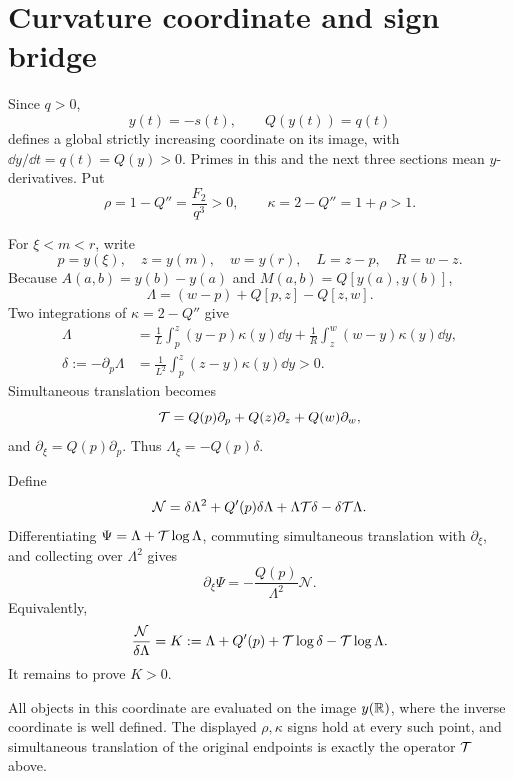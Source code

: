 \section{Curvature coordinate and sign bridge}\label{sec:coordinate}

Since \(q>0\),
\[
 y(t)=-s(t),\qquad Q(y(t))=q(t)
\]
defines a global strictly increasing coordinate on its image, with
\(\dd y/\dd t=q(t)=Q(y)>0\). Primes in this and the next three sections mean
\(y\)-derivatives. Put
\[
 \rho=1-Q''=\frac{F_2}{q^3}>0,
 \qquad \kappa=2-Q''=1+\rho>1.
\]

For \(\xi<m<r\), write
\[
 p=y(\xi),\quad z=y(m),\quad w=y(r),\quad L=z-p,\quad R=w-z.
\]
Because \(A(a,b)=y(b)-y(a)\) and
\(M(a,b)=Q[y(a),y(b)]\),
\begin{equation}\label{eq:Lambda-coordinate}
 \Lambda=(w-p)+Q[p,z]-Q[z,w].
\end{equation}
Two integrations of \(\kappa=2-Q''\) give
\begin{align}
 \Lambda&=\frac1L\int_p^z(y-p)\kappa(y)\dd y
 +\frac1R\int_z^w(w-y)\kappa(y)\dd y,\label{eq:Lambda-triangular}\\
 \delta:=-\partial_p\Lambda
 &=\frac1{L^2}\int_p^z(z-y)\kappa(y)\dd y>0.
 \label{eq:delta-triangular}
\end{align}
Simultaneous translation becomes
\[
 \mathcal{T}=Q(p)\partial_p+Q(z)\partial_z+Q(w)\partial_w,
\]
and \(\partial_\xi=Q(p)\partial_p\). Thus
\(\Lambda_\xi=-Q(p)\delta\).

Define
\begin{equation}\label{eq:N-def}
 \mathcal N=\delta\Lambda^2+Q'(p)\delta\Lambda+
 \Lambda\mathcal{T}\delta-\delta\mathcal{T}\Lambda.
\end{equation}
Differentiating \(\Psi=\Lambda+\mathcal{T}\log\Lambda\), commuting simultaneous
translation with \(\partial_\xi\), and collecting over \(\Lambda^2\) gives
\begin{equation}\label{eq:sign-bridge}
 \partial_\xi\Psi=-\frac{Q(p)}{\Lambda^2}\mathcal N.
\end{equation}
Equivalently,
\begin{equation}\label{eq:K-def}
 \frac{\mathcal N}{\delta\Lambda}
 =K:=\Lambda+Q'(p)+\mathcal{T}\log\delta-\mathcal{T}\log\Lambda.
\end{equation}
It remains to prove \(K>0\).

All objects in this coordinate are evaluated on the image \(y(\mathbb{R})\), where
the inverse coordinate is well defined. The displayed \(\rho,\kappa\) signs
hold at every such point, and simultaneous translation of the original
endpoints is exactly the operator \(\mathcal{T}\) above.
